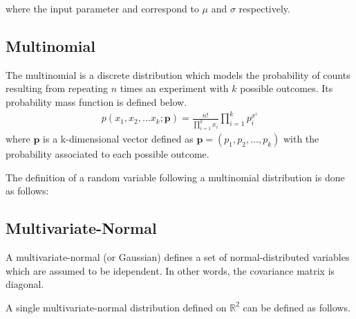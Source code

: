 \documentclass[letterpaper,10pt,english]{sphinxmanual}
\begin{document}
where the input parameter  and  correspond to \(\mu\) and \(\sigma\) respectively.


\subsection{Multinomial}
\label{\detokenize{notes/guidemodels:multinomial}}
The multinomial is a discrete distribution which models the probability of counts resulting from repeating \(n\)
times an experiment with \(k\) possible outcomes. Its probability mass function is defined below.
\begin{equation*}
\begin{split}p(x_1,x_2,\ldots x_k; \mathbf{p}) =  \frac{n!}{\prod_{i=1}^k x_i}\prod_{i=1}^k p_i^{x^i}\end{split}
\end{equation*}
where \(\mathbf{p}\) is a k-dimensional vector defined as \(\mathbf{p} = (p_1, p_2, \ldots, p_k)\) with the probability
associated to each possible outcome.

The definition of a random variable following a multinomial distribution is done as follows:

\begin{sphinxVerbatim}[commandchars=\\\{\}]
   \PYG{p}{[}\PYG{p}{]}


   \PYG{p}{[}\PYG{p}{]}
\end{sphinxVerbatim}


\subsection{Multivariate-Normal}
\label{\detokenize{notes/guidemodels:multivariate-normal}}
A multivariate-normal (or Gaussian) defines a set of  normal-distributed variables which are assumed
to be idependent. In other words, the covariance matrix is diagonal.

A single multivariate-normal distribution defined on \(\mathbb{R}^2\) can be defined as follows.
\end{document}
